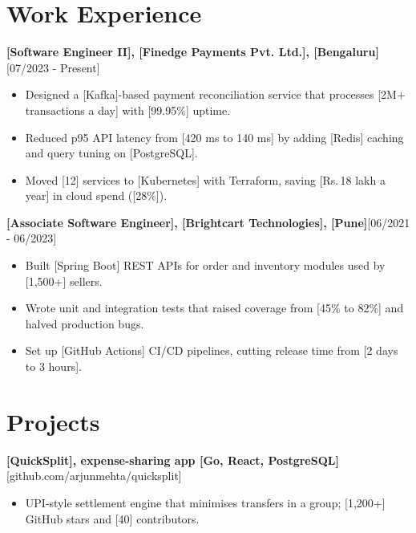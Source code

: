 \documentclass[10pt]{article}
\newcommand{\entry}[2]{\textbf{#1}\hfill #2\par}
\begin{document}
\section{Work Experience}

\entry{\textbf{[Software Engineer II]}, [Finedge Payments Pvt. Ltd.], [Bengaluru]}{[07/2023 - Present]}

\begin{itemize}
  \item Designed a [Kafka]-based payment reconciliation service that processes [2M+ transactions a day] with [99.95\%] uptime.
  \item Reduced p95 API latency from [420 ms to 140 ms] by adding [Redis] caching and query tuning on [PostgreSQL].
  \item Moved [12] services to [Kubernetes] with Terraform, saving [Rs.\,18 lakh a year] in cloud spend ([28\%]).
\end{itemize}

\vspace{4pt}

\entry{\textbf{[Associate Software Engineer]}, [Brightcart Technologies], [Pune]}{[06/2021 - 06/2023]}

\begin{itemize}
  \item Built [Spring Boot] REST APIs for order and inventory modules used by [1,500+] sellers.
  \item Wrote unit and integration tests that raised coverage from [45\% to 82\%] and halved production bugs.
  \item Set up [GitHub Actions] CI/CD pipelines, cutting release time from [2 days to 3 hours].
\end{itemize}

\vspace{4pt}

\section{Projects}

\entry{\textbf{[QuickSplit]}, expense-sharing app  \textbar{}  [Go, React, PostgreSQL]}{[github.com/arjunmehta/quicksplit]}

\begin{itemize}
  \item UPI-style settlement engine that minimises transfers in a group; [1,200+] GitHub stars and [40] contributors.
\end{itemize}

\vspace{4pt}
\end{document}
